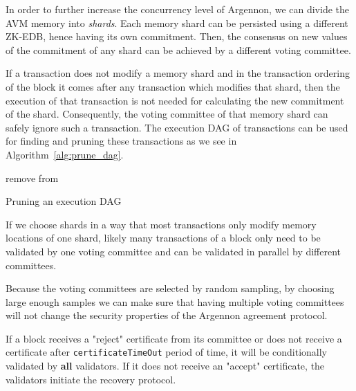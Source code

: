 In order to further increase the concurrency level of Argennon, we can divide the AVM memory into \emph{shards}.
Each memory shard can be persisted using a different ZK-EDB, hence having its own commitment. Then, the
consensus on new values of the commitment of any shard can be achieved by a different voting committee.

If a transaction does not modify a memory shard and in the transaction ordering of the block it comes after
any transaction which modifies that shard, then the execution of that transaction is not needed for calculating
the new commitment of the shard. Consequently, the voting committee of that memory shard can safely ignore such a
transaction. The execution DAG of transactions can be used for finding and pruning these transactions as
we see in Algorithm~\ref{alg:prune_dag}.

\begin{algorithm}
    \DontPrintSemicolon
    \BlankLine
    {
        \RPrune{\V}\;
    }
    \BlankLine
    \Fn{\RPrune{\V}}
    {
        {
            remove \V from \Graph\;
            {
                \;
            }
        }
    }
    \caption{Pruning an execution DAG}\label{alg:prune_dag}
\end{algorithm}

If we choose shards in a way that most transactions only modify memory locations of one shard,
likely many transactions of a block only need to be validated by one voting committee and can be validated in
parallel by different committees.

Because the voting committees are selected by random sampling, by choosing large enough samples we can make sure
that having multiple voting committees will not change the security properties of the Argennon agreement protocol.


If a block receives a "reject" certificate from its committee or does not receive a certificate
after \texttt{certificateTimeOut} period of time, it will be conditionally validated by \textbf{all} validators. If
it does not receive an "accept" certificate, the validators initiate the recovery protocol.




